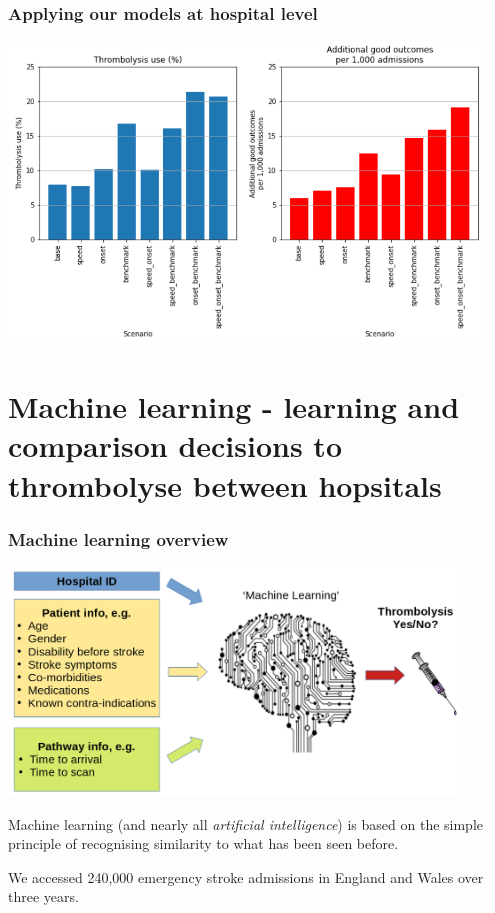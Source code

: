\documentclass{beamer}
\begin{document}

\begin{frame}
\frametitle{Applying our models at hospital level}

\begin{center}
\includegraphics[width=0.95\textwidth]{./images/hosp_scenario_1}
\end{center}

\end{frame}

\section{Machine learning - learning and comparison decisions to thrombolyse between hopsitals}



\begin{frame}
\frametitle{Machine learning overview}
\begin{center}
\includegraphics[width=0.90\textwidth]{./images/ml_model_high_level}
\end{center}


Machine learning (and nearly all \emph{artificial intelligence}) is based on the simple principle of recognising similarity to what has been seen before.
\vspace{3mm}

We accessed 240,000 emergency stroke admissions in England and Wales over three years.
\end{frame}
\end{document}
